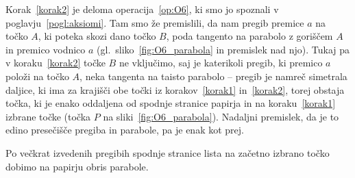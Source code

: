 Korak~\ref{korak2} je deloma operacija~\ref{op:O6}, ki smo jo spoznali v poglavju~\ref{pogl:aksiomi}. Tam smo že premislili, da nam pregib premice $a$ na točko $A$, ki poteka skozi dano točko $B$, poda tangento na parabolo z goriščem $A$ in premico vodnico $a$ (gl.\ sliko~\ref{fig:O6_parabola} in premislek nad njo). Tukaj pa v koraku~\ref{korak2} točke $B$ ne vključimo, saj je katerikoli pregib, ki premico $a$ položi na točko $A$, neka tangenta na taisto parabolo -- pregib je namreč simetrala daljice, ki ima za krajišči obe točki iz korakov~\ref{korak1} in~\ref{korak2}, torej obstaja točka, ki je enako oddaljena od spodnje stranice papirja in na koraku~\ref{korak1} izbrane točke (točka $P$ na sliki~\ref{fig:O6_parabola}). Nadaljni premislek, da je to edino presečišče pregiba in parabole, pa je enak kot prej.

Po večkrat izvedenih pregibih spodnje stranice lista na začetno izbrano točko dobimo na papirju obris parabole.